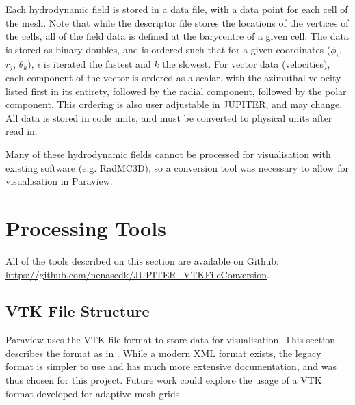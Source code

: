 \documentclass[preprint2]{aastex62}
\begin{document}
Each hydrodynamic field is stored in a data file, with a data point for each cell of the mesh. Note that while the descriptor file stores the locations of the vertices of the cells, all of the field data is defined at the barycentre of a given cell. The data is stored as binary doubles, and is ordered such that for a given coordinates ($\phi_{i}$, $r_{j}$, $\theta_{k}$), $i$ is iterated the fastest and $k$ the slowest. For vector data (velocities), each component of the vector is ordered as a scalar, with the azimuthal velocity listed first in its entirety, followed by the radial component, followed by the polar component. This ordering is also user adjustable in JUPITER, and may change. All data is stored in code units, and must be converted to physical units after read in.

Many of these hydrodynamic fields cannot be processed for visualisation with existing software (e.g. RadMC3D), so a conversion tool was necessary to allow for visualisation in Paraview.
\section{Processing Tools}\label{sec:code}
All of the tools described on this section are available on Github: \url{https://github.com/nenasedk/JUPITER_VTKFileConversion}. 
\subsection{VTK File Structure}\label{sec:vtk}
Paraview uses the VTK file format to store data for visualisation. This section describes the format as in \cite{Formats2009}. While a modern XML format exists, the legacy format is simpler to use and has much more extensive documentation, and was thus chosen for this project. Future work could explore the usage of a VTK format developed for adaptive mesh grids.
\end{document}
